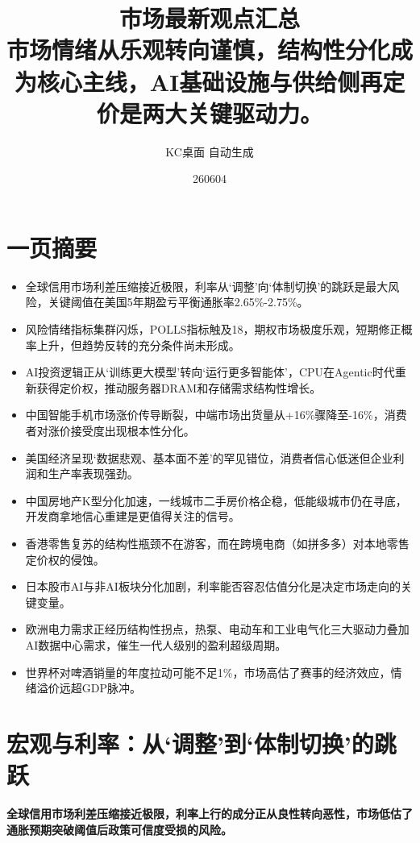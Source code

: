 \documentclass[11pt]{ctexart}
\title{\textbf{市场最新观点汇总}\\[0.4em]{\large 市场情绪从乐观转向谨慎，结构性分化成为核心主线，AI基础设施与供给侧再定价是两大关键驱动力。}}
\author{KC桌面 自动生成}
\date{260604}
\begin{document}
\maketitle
\tableofcontents
\newpage
\section{一页摘要}
\begin{itemize}
  \item 全球信用市场利差压缩接近极限，利率从‘调整’向‘体制切换’的跳跃是最大风险，关键阈值在美国5年期盈亏平衡通胀率2.65\%-2.75\%。
  \item 风险情绪指标集群闪烁，POLLS指标触及18，期权市场极度乐观，短期修正概率上升，但趋势反转的充分条件尚未形成。
  \item AI投资逻辑正从‘训练更大模型’转向‘运行更多智能体’，CPU在Agentic时代重新获得定价权，推动服务器DRAM和存储需求结构性增长。
  \item 中国智能手机市场涨价传导断裂，中端市场出货量从+16\%骤降至-16\%，消费者对涨价接受度出现根本性分化。
  \item 美国经济呈现‘数据悲观、基本面不差’的罕见错位，消费者信心低迷但企业利润和生产率表现强劲。
  \item 中国房地产K型分化加速，一线城市二手房价格企稳，低能级城市仍在寻底，开发商拿地信心重建是更值得关注的信号。
  \item 香港零售复苏的结构性瓶颈不在游客，而在跨境电商（如拼多多）对本地零售定价权的侵蚀。
  \item 日本股市AI与非AI板块分化加剧，利率能否容忍估值分化是决定市场走向的关键变量。
  \item 欧洲电力需求正经历结构性拐点，热泵、电动车和工业电气化三大驱动力叠加AI数据中心需求，催生一代人级别的盈利超级周期。
  \item 世界杯对啤酒销量的年度拉动可能不足1\%，市场高估了赛事的经济效应，情绪溢价远超GDP脉冲。
\end{itemize}
\section{宏观与利率：从‘调整’到‘体制切换’的跳跃}
\textbf{全球信用市场利差压缩接近极限，利率上行的成分正从良性转向恶性，市场低估了通胀预期突破阈值后政策可信度受损的风险。}
\end{document}
